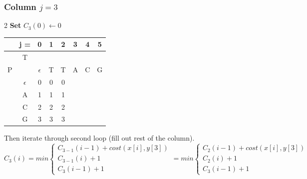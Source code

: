 \subsubsection*{Column $j = 3$}
\begin{multicols}{2}
    \textbf{Set} $C_3(0) \gets 0$

    \begin{center}
        \begin{tabular}{|c c|c|c|c|c|c|c|} \hline
        &   j =  &  0           &   1   &   2   &   3   &   4   &   5   \\ \hline
        &   T    &              &       &       &       &       &       \\
        P   &        &  $\epsilon$  &   T   &   T   &   A   &   C   &   G   \\ \hline
        & $\epsilon$ &       0      & 0     &0      &  \ccr0     &       &       \\ \hline
        &    A   &     1        &  1    &   1   &       &       &       \\ \hline
        &    C   & 2            &  2    &   2   &       &       &       \\ \hline
        &    G   & 3            &   3   & 3     &       &       &       \\ \hline
        \end{tabular}
    \end{center}
\end{multicols}

Then iterate through second loop (fill out rest of the column).
\[
    C_3(i) = min \begin{cases}
                     C_{3-1}(i-1) + cost(x[i], y[3]) \\
                     C_{3-1}(i) + 1 \\
                     C_3(i-1) + 1
    \end{cases} =  min \begin{cases}
                           C_{2}(i-1) + cost(x[i], y[3]) \\
                           C_{2}(i) + 1 \\
                           C_3(i-1) + 1
    \end{cases}
\]



